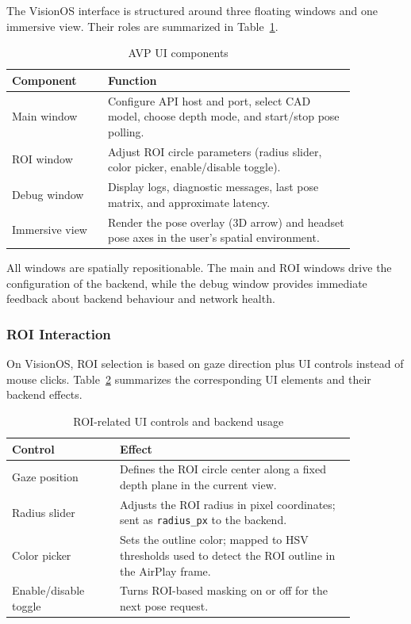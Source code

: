 The VisionOS interface is structured around three floating windows and one immersive view. Their roles are summarized in Table~\ref{tab:avp-windows}.

\begin{table}[H]
    \centering
    \caption{AVP UI components}
    \label{tab:avp-windows}
    \begin{tabular}{p{0.24\linewidth}p{0.62\linewidth}}
        \toprule
        \textbf{Component} & \textbf{Function} \\
        \midrule
        Main window &
        Configure API host and port, select CAD model, choose depth mode, and start/stop pose polling. \\
        ROI window &
        Adjust ROI circle parameters (radius slider, color picker, enable/disable toggle). \\
        Debug window &
        Display logs, diagnostic messages, last pose matrix, and approximate latency. \\
        Immersive view &
        Render the pose overlay (3D arrow) and headset pose axes in the user’s spatial environment. \\
        \bottomrule
    \end{tabular}
\end{table}

All windows are spatially repositionable. The main and ROI windows drive the configuration of the backend, while the debug window provides immediate feedback about backend behaviour and network health.

\subsubsection{ROI Interaction}

On VisionOS, ROI selection is based on gaze direction plus UI controls instead of mouse clicks. Table~\ref{tab:roi-controls} summarizes the corresponding UI elements and their backend effects.

\begin{table}[H]
    \centering
    \caption{ROI-related UI controls and backend usage}
    \label{tab:roi-controls}
    \begin{tabular}{p{0.27\linewidth}p{0.59\linewidth}}
        \toprule
        \textbf{Control} & \textbf{Effect} \\
        \midrule
        Gaze position &
        Defines the ROI circle center along a fixed depth plane in the current view. \\
        Radius slider &
        Adjusts the ROI radius in pixel coordinates; sent as \texttt{radius\_px} to the backend. \\
        Color picker &
        Sets the outline color; mapped to HSV thresholds used to detect the ROI outline in the AirPlay frame. \\
        Enable/disable toggle &
        Turns ROI-based masking on or off for the next pose request. \\
        \bottomrule
    \end{tabular}
\end{table}

